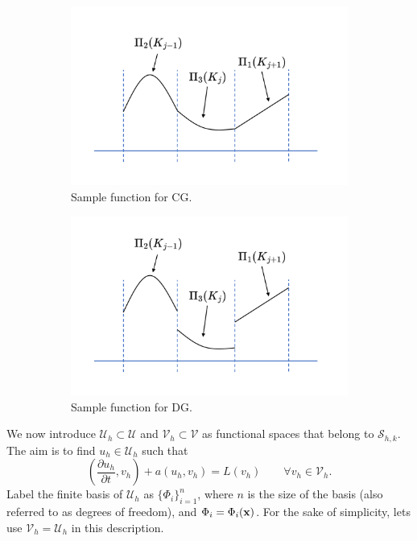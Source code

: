 \documentclass[oneside,a4paper,11pt]{report}
\begin{document}
\begin{figure}[ht]
    \centering
    \begin{subfigure}[b]{0.48\textwidth}
        \includegraphics[width=\textwidth]{../../images/cg_fe_space.pdf}
        \caption{Sample function for CG.}
        \label{fig:fe_cg_sample_function}
    \end{subfigure}
    \begin{subfigure}[b]{0.48\textwidth}
        \includegraphics[width=\textwidth]{../../images/dg_fe_space.pdf}
        \caption{Sample function for DG.}
        \label{fig:fe_dg_sample_function}
    \end{subfigure}
    \caption{}
    \label{fig:fe_cg_dg_sample_functions}
 \end{figure}

We now introduce $\mathcal{U}_h \subset \mathcal{U}$ and $\mathcal{V}_h \subset \mathcal{V}$ as functional spaces that belong to $\mathcal{S}_{h,k}$. The aim is to find $u_h \in \mathcal{U}_h$ such that
\begin{equation}
    \label{eq:fe_elliptic_sh_solution}
        \left ( \frac{\partial u_h}{\partial t} , v_h \right ) + a(u_h,v_h) = L(v_h) \qquad \forall v_h \in \mathcal{V}_h.
    \end{equation}
Label the finite basis of $\mathcal{U}_h$ as $\{\Phi_i\}_{i=1}^n$, where $n$ is the size of the basis (also referred to as degrees of freedom), and $\Phi_i = \Phi_i(\mathbf{x})$. For the sake of simplicity, lets use $\mathcal{V}_h = \mathcal{U}_h$ in this description. 
\end{document}
